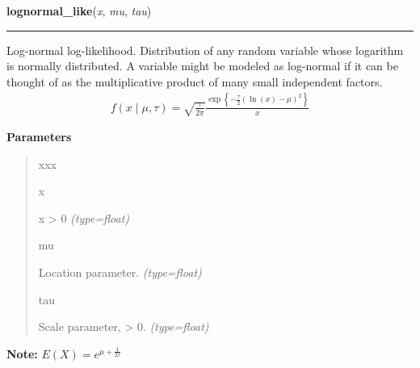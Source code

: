     \begin{boxedminipage}{\textwidth}

    \raggedright \textbf{lognormal\_like}(\textit{x}, \textit{mu}, \textit{tau})

    \vspace{-1.5ex}

    \rule{\textwidth}{0.5\fboxrule}

Log-normal log-likelihood. Distribution of any random variable whose
logarithm is normally distributed. A variable might be modeled as
log-normal if it can be thought of as the multiplicative product of many
small independent factors.
\begin{equation*}\begin{split}f(x \mid \mu, \tau) = \sqrt{\frac{\tau}{2\pi}}\frac{\exp\left\{ -\frac{\tau}{2} (\ln(x)-\mu)^2 \right\}}{x}\end{split}\end{equation*}    \vspace{1ex}

      \textbf{Parameters}
      \begin{quote}
        \begin{Ventry}{xxx}

          \item[x]


x {\textgreater} 0
            \textit{(type=float)}

          \item[mu]


Location parameter.
            \textit{(type=float)}

          \item[tau]


Scale parameter, {\textgreater} 0.
            \textit{(type=float)}

        \end{Ventry}

      \end{quote}

    \vspace{1ex}

\textbf{Note:} 
$E(X)=e^{\mu+\frac{1}{2\tau}}$


    \end{boxedminipage}

    \label{pymc:distributions:rmultinomial}

    \vspace{0.5ex}


